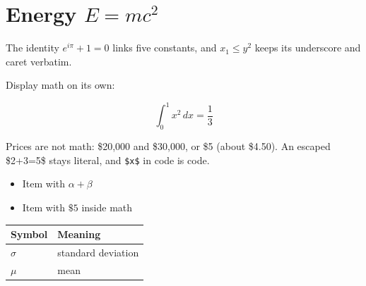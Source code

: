 \section{Energy $E = mc^2$}

The identity $e^{i\pi} + 1 = 0$ links five constants, and $x_1 \le y^2$ keeps its underscore and caret verbatim.

Display math on its own:

\[\int_0^1 x^2 \, dx = \frac{1}{3}\]

Prices are not math: \$20,000 and \$30,000, or \$5 (about \$4.50). An escaped \$2+3=5\$ stays literal, and \texttt{\$x\$} in code is code.

\begin{itemize}
  \item Item with $\alpha + \beta$
  \item Item with $\$5$ inside math
\end{itemize}

\begin{tabular}{ll}
\toprule
Symbol & Meaning \\
\midrule
$\sigma$ & standard deviation \\
$\mu$ & mean \\
\bottomrule
\end{tabular}

